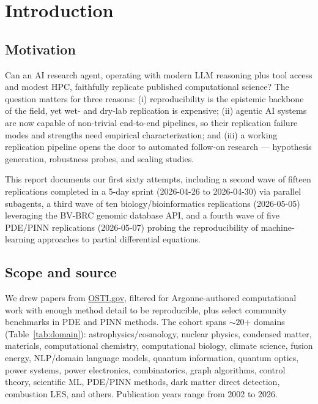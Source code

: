 \documentclass[11pt]{article}
\begin{document}
\section{Introduction}

\subsection{Motivation}
Can an AI research agent, operating with modern LLM reasoning plus tool access
and modest HPC, faithfully replicate published computational science? The
question matters for three reasons: (i) reproducibility is the epistemic
backbone of the field, yet wet- and dry-lab replication is expensive;
(ii) agentic AI systems are now capable of non-trivial end-to-end pipelines,
so their replication failure modes and strengths need empirical characterization;
and (iii) a working replication pipeline opens the door to automated follow-on
research --- hypothesis generation, robustness probes, and scaling studies.

This report documents our first sixty attempts, including a second wave
of fifteen replications completed in a 5-day sprint (2026-04-26 to
2026-04-30) via parallel subagents, a third wave of ten
biology/bioinformatics replications (2026-05-05) leveraging the BV-BRC
genomic database API, and a fourth wave of five PDE/PINN replications
(2026-05-07) probing the reproducibility of machine-learning approaches
to partial differential equations.

\subsection{Scope and source}
We drew papers from \href{https://www.osti.gov}{OSTI.gov}, filtered for
Argonne-authored computational work with enough method detail to be
reproducible, plus select community benchmarks in PDE and PINN methods.
The cohort spans $\sim 20$+ domains
(Table~\ref{tab:domain}): astrophysics/cosmology, nuclear physics, condensed
matter, materials, computational chemistry, computational biology, climate
science, fusion energy, NLP/domain language models, quantum
information, quantum optics, power systems, power electronics, combinatorics,
graph algorithms, control theory, scientific ML, PDE/PINN methods, dark matter direct detection,
combustion LES, and others. Publication years range from 2002 to 2026.
\end{document}
